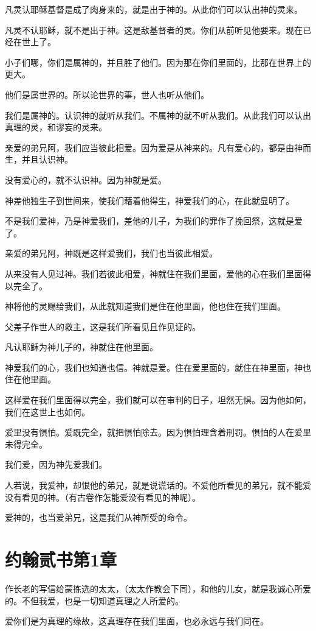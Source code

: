 \documentclass[12pt,oneside]{book}
\begin{document}
凡灵认耶稣基督是成了肉身来的，就是出于神的。从此你们可以认出神的灵来。

凡灵不认耶稣，就不是出于神。这是敌基督者的灵。你们从前听见他要来。现在已经在世上了。

小子们哪，你们是属神的，并且胜了他们。因为那在你们里面的，比那在世界上的更大。

他们是属世界的。所以论世界的事，世人也听从他们。

我们是属神的。认识神的就听从我们。不属神的就不听从我们。从此我们可以认出真理的灵，和谬妄的灵来。

亲爱的弟兄阿，我们应当彼此相爱。因为爱是从神来的。凡有爱心的，都是由神而生，并且认识神。

没有爱心的，就不认识神。因为神就是爱。

神差他独生子到世间来，使我们藉着他得生，神爱我们的心，在此就显明了。

不是我们爱神，乃是神爱我们，差他的儿子，为我们的罪作了挽回祭，这就是爱了。

亲爱的弟兄阿，神既是这样爱我们，我们也当彼此相爱。

从来没有人见过神。我们若彼此相爱，神就住在我们里面，爱他的心在我们里面得以完全了。

神将他的灵赐给我们，从此就知道我们是住在他里面，他也住在我们里面。

父差子作世人的救主，这是我们所看见且作见证的。

凡认耶稣为神儿子的，神就住在他里面。

神爱我们的心，我们也知道也信。神就是爱。住在爱里面的，就住在神里面，神也住在他里面。

这样爱在我们里面得以完全，我们就可以在审判的日子，坦然无惧。因为他如何，我们在这世上也如何。

爱里没有惧怕。爱既完全，就把惧怕除去。因为惧怕理含着刑罚。惧怕的人在爱里未得完全。

我们爱，因为神先爱我们。

人若说，我爱神，却恨他的弟兄，就是说谎话的。不爱他所看见的弟兄，就不能爱没有看见的神。（有古卷作怎能爱没有看见的神呢）。

爱神的，也当爱弟兄，这是我们从神所受的命令。

\chapter{约翰贰书第1章}
作长老的写信给蒙拣选的太太，（太太作教会下同），和他的儿女，就是我诚心所爱的。不但我爱，也是一切知道真理之人所爱的。

爱你们是为真理的缘故，这真理存在我们里面，也必永远与我们同在。
\end{document}

